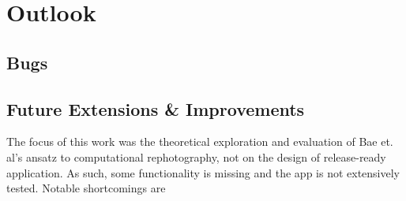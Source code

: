 \chapter{Outlook}
\section{Bugs}
\section{Future Extensions \& Improvements}

The focus of this work was the theoretical exploration and evaluation of Bae et.
al's ansatz to computational rephotography, not on the design of release-ready
application. As such, some functionality is missing and the app is not
extensively tested. Notable shortcomings are
